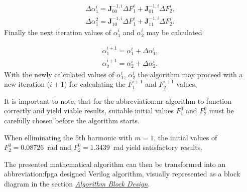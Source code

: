 \documentclass[a4paper, twoside, 11pt]{article}
\begin{document}
        \begin{equation}
            \begin{gathered}
                \Delta \alpha_1^i = \textbf{J}_{00}^{-1,i} \Delta F_1^i + \textbf{J}_{01}^{-1,i} \Delta F_2^i,\\
                \Delta \alpha_1^2 = \textbf{J}_{10}^{-1,i} \Delta F_1^i + \textbf{J}_{11}^{-1,i} \Delta F_2^i.
            \end{gathered}
        \end{equation}
        Finally the next iteration values of $\alpha_1^i$ and $\alpha_2^i$ may be calculated

        \begin{equation}
            \begin{gathered}
                \alpha_1^{i+1} = \alpha_1^i + \Delta \alpha_1^i,\\
                \alpha_2^{i+1} = \alpha_2^i + \Delta \alpha_2^i.
            \end{gathered}
        \end{equation}
        With the newly calculated values of $\alpha_1^i$, $\alpha_2^i$ the algorithm may proceed with a new iteration ($i+1$) for calculating the $F_1^{i+1}$ and $F_2^{i+1}$ values.\par
        It is important to note, that for the \gls{abbreviation:nr} algorithm to function correctly and yield viable results, suitable initial values $F_1^0$ and $F_2^0$ must be carefully chosen before the algorithm starts.\par
        When elliminating the 5th harmonic with $m = 1$, the initial values of $F_2^0 = 0.08726$~rad and $F_2^0 = 1.3439$~rad yield satisfactory results.\par
        The presented mathematical algorithm can then be transformed into an \gls{abbreviation:fpga} designed Verilog algorithm, visually represented as a block diagram in the section \hyperref[subsubsec:algorithm-block-design]{\textit{Algorithm Block Design}}.
\end{document}

